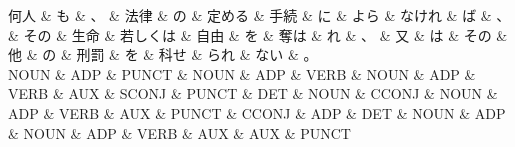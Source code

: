 \documentclass[tikz,border=5pt]{standalone}
\begin{document}
\small
\begin{dependency}[edge unit distance=12.0pt]
    \begin{deptext}[column sep=0.5em]
        何人 \& も \& 、 \& 法律 \& の \& 定める \& 手続 \& に \& よら \& なけれ \& ば \& 、 \& その \& 生命 \& 若しくは \& 自由 \& を \& 奪は \& れ \& 、 \& 又 \& は \& その \& 他 \& の \& 刑罰 \& を \& 科せ \& られ \& ない \& 。\\
        NOUN \& ADP \& PUNCT \& NOUN \& ADP \& VERB \& NOUN \& ADP \& VERB \& AUX \& SCONJ \& PUNCT \& DET \& NOUN \& CCONJ \& NOUN \& ADP \& VERB \& AUX \& PUNCT \& CCONJ \& ADP \& DET \& NOUN \& ADP \& NOUN \& ADP \& VERB \& AUX \& AUX \& PUNCT\\
    \end{deptext}
\end{dependency}
\end{document}
